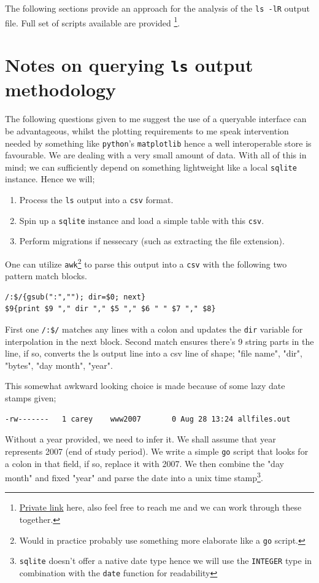 \documentclass{article}
\begin{document}
\newpage
The following sections provide an approach for the analysis of the \texttt{ls -lR} output file. Full set of scripts available are provided \footnote{\href{https://gitfront.io/r/user-5047466/ZFVr4eV9CukU/cs742-published-scripts/}{Private link} here, also feel free to reach me and we can work through these together.}.
\section*{Notes on querying \texttt{ls} output methodology}
The following questions given to me suggest the use of a queryable interface can be advantageous, whilst the plotting requirements to me speak intervention needed by something like \texttt{python}'s \texttt{matplotlib} hence a well interoperable store is favourable. We are dealing with a very small amount of data.  With all of this in mind; we can sufficiently depend on something lightweight like a local \texttt{sqlite} instance. Hence we will;

\begin{enumerate}
				\item Process the \texttt{ls} output into a \texttt{csv} format.
				\item Spin up a \texttt{sqlite} instance and load a simple table with this \texttt{csv}.
				\item Perform migrations if nessecary (such as extracting the file extension).
\end{enumerate}

One can utilize \texttt{awk}\footnote{Would in practice probably use something more elaborate like a \texttt{go} script.} to parse this output into a \texttt{csv} with the following two pattern match blocks.
\begin{small}
\begin{verbatim}
/:$/{gsub(":",""); dir=$0; next}
$9{print $9 "," dir "," $5 "," $6 " " $7 "," $8}
\end{verbatim}
\end{small}

First one \texttt{/:\$/} matches any lines with a colon and updates the \texttt{dir} variable for interpolation in the next block. Second match ensures there's 9 string parts in the line, if so, converts the ls output line into a csv line of shape; "file name", "dir", "bytes", "day month", "year".

This somewhat awkward looking choice is made because of some lazy date stamps given;
\begin{small}
\begin{verbatim}
-rw-------   1 carey    www2007       0 Aug 28 13:24 allfiles.out
\end{verbatim}
\end{small}
Without a year provided, we need to infer it. We shall assume that year represents 2007 (end of study period). We write a simple \texttt{go} script that looks for a colon in that field, if so, replace it with 2007. We then combine the "day month" and fixed "year" and parse the date into a unix time stamp\footnote{\texttt{sqlite} doesn't offer a native date type hence we will use the \texttt{INTEGER} type in combination with the \texttt{date} function for readability}.
\end{document}
